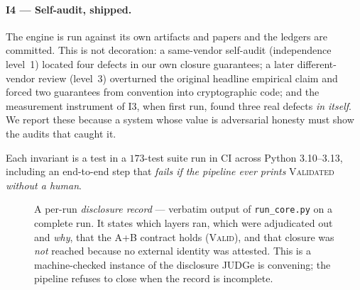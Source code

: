 \documentclass{article}
\begin{document}
\paragraph{I4 --- Self-audit, shipped.} The engine is run against its own artifacts and papers and the
ledgers are committed. This is not decoration: a same-vendor self-audit (independence level~1) located
four defects in our own closure guarantees; a later different-vendor review (level~3) overturned the
original headline empirical claim and forced two guarantees from convention into cryptographic code; and
the measurement instrument of I3, when first run, found three real defects \emph{in itself}. We report
these because a system whose value is adversarial honesty must show the audits that caught it.

Each invariant is a test in a $173$-test suite run in CI across Python 3.10--3.13, including an
end-to-end step that \emph{fails if the pipeline ever prints} \textsc{Validated} \emph{without a human}.

\begin{figure}[t]
\centering
{}
\caption{A per-run \emph{disclosure record} --- verbatim output of \texttt{run\_core.py} on a complete
run. It states which layers ran, which were adjudicated out and \emph{why}, that the A+B contract holds
(\textsc{Valid}), and that closure was \emph{not} reached because no external identity was attested. This
is a machine-checked instance of the disclosure JUDGe is convening; the pipeline refuses to close when
the record is incomplete.}
\label{fig:disclosure}
\end{figure}
\end{document}
